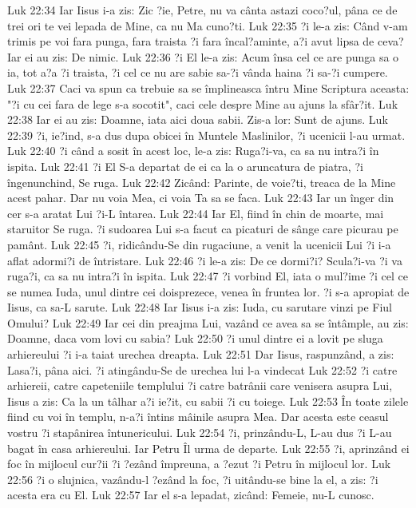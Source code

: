 Luk 22:34  Iar Iisus i-a zis: Zic ?ie, Petre, nu va cânta astazi coco?ul, pâna ce de trei ori te vei lepada de Mine, ca nu Ma cuno?ti.
Luk 22:35  ?i le-a zis: Când v-am trimis pe voi fara punga, fara traista ?i fara încal?aminte, a?i avut lipsa de ceva? Iar ei au zis: De nimic.
Luk 22:36  ?i El le-a zis: Acum însa cel ce are punga sa o ia, tot a?a ?i traista, ?i cel ce nu are sabie sa-?i vânda haina ?i sa-?i cumpere.
Luk 22:37  Caci va spun ca trebuie sa se împlineasca întru Mine Scriptura aceasta: "?i cu cei fara de lege s-a socotit", caci cele despre Mine au ajuns la sfâr?it.
Luk 22:38  Iar ei au zis: Doamne, iata aici doua sabii. Zis-a lor: Sunt de ajuns.
Luk 22:39  ?i, ie?ind, s-a dus dupa obicei în Muntele Maslinilor, ?i ucenicii l-au urmat.
Luk 22:40  ?i când a sosit în acest loc, le-a zis: Ruga?i-va, ca sa nu intra?i în ispita.
Luk 22:41  ?i El S-a departat de ei ca la o aruncatura de piatra, ?i îngenunchind, Se ruga.
Luk 22:42  Zicând: Parinte, de voie?ti, treaca de la Mine acest pahar. Dar nu voia Mea, ci voia Ta sa se faca.
Luk 22:43  Iar un înger din cer s-a aratat Lui ?i-L întarea.
Luk 22:44  Iar El, fiind în chin de moarte, mai staruitor Se ruga. ?i sudoarea Lui s-a facut ca picaturi de sânge care picurau pe pamânt.
Luk 22:45  ?i, ridicându-Se din rugaciune, a venit la ucenicii Lui ?i i-a aflat adormi?i de întristare.
Luk 22:46  ?i le-a zis: De ce dormi?i? Scula?i-va ?i va ruga?i, ca sa nu intra?i în ispita.
Luk 22:47  ?i vorbind El, iata o mul?ime ?i cel ce se numea Iuda, unul dintre cei doisprezece, venea în fruntea lor. ?i s-a apropiat de Iisus, ca sa-L sarute.
Luk 22:48  Iar Iisus i-a zis: Iuda, cu sarutare vinzi pe Fiul Omului?
Luk 22:49  Iar cei din preajma Lui, vazând ce avea sa se întâmple, au zis: Doamne, daca vom lovi cu sabia?
Luk 22:50  ?i unul dintre ei a lovit pe sluga arhiereului ?i i-a taiat urechea dreapta.
Luk 22:51  Dar Iisus, raspunzând, a zis: Lasa?i, pâna aici. ?i atingându-Se de urechea lui l-a vindecat
Luk 22:52  ?i catre arhiereii, catre capeteniile templului ?i catre batrânii care venisera asupra Lui, Iisus a zis: Ca la un tâlhar a?i ie?it, cu sabii ?i cu toiege.
Luk 22:53  În toate zilele fiind cu voi în templu, n-a?i întins mâinile asupra Mea. Dar acesta este ceasul vostru ?i stapânirea întunericului.
Luk 22:54  ?i, prinzându-L, L-au dus ?i L-au bagat în casa arhiereului. Iar Petru Îl urma de departe.
Luk 22:55  ?i, aprinzând ei foc în mijlocul cur?ii ?i ?ezând împreuna, a ?ezut ?i Petru în mijlocul lor.
Luk 22:56  ?i o slujnica, vazându-l ?ezând la foc, ?i uitându-se bine la el, a zis: ?i acesta era cu El.
Luk 22:57  Iar el s-a lepadat, zicând: Femeie, nu-L cunosc.
